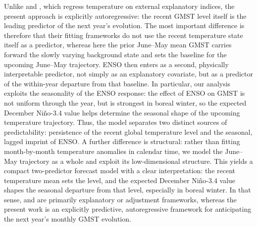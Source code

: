 \documentclass[draft]{agujournal2019}
\begin{document}
Unlike  and ,
  which regress temperature on external explanatory indices, the
  present approach is explicitly autoregressive: the recent GMST level
  itself is the leading predictor of the next year's evolution. The most important difference is therefore that their fitting
  frameworks do not use the recent temperature state itself as a
  predictor, whereas here the prior June--May mean GMST carries
  forward the slowly varying background state and sets the baseline
  for the upcoming June--May trajectory. ENSO then enters as a second, physically interpretable predictor,
  not simply as an explanatory covariate, but as a predictor of the
  within-year departure from that baseline. In particular, our analysis exploits the seasonality of the ENSO
  response: the effect of ENSO on GMST is not
  uniform through the year, but is strongest in boreal winter, so the
  expected December Niño-3.4 value helps determine the seasonal shape
  of the upcoming temperature trajectory. Thus, the model separates two distinct sources of predictability:
  persistence of the recent global temperature level and the seasonal,
  lagged imprint of ENSO. A further difference is structural: rather than fitting
  month-by-month temperature anomalies in calendar time, we model the
  June--May trajectory as a whole and exploit its low-dimensional
  structure. This yields a compact two-predictor forecast model with a clear
  interpretation: the recent temperature mean sets the level, and the
  expected December Niño-3.4 value shapes the seasonal departure from
  that level, especially in boreal winter. In that sense,  and
   are primarily explanatory or adjustment
  frameworks, whereas the present work is an explicitly predictive,
  autoregressive framework for anticipating the next year's monthly
  GMST evolution.
\end{document}
